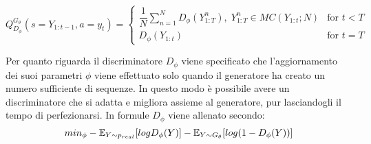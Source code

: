 $$
Q_{D_\phi}^{G_\theta}
( s = Y_{1:t-1} ,
a = y_t)
=
\left\{\begin{array}{lr}
    \dfrac{1}{N} \sum_{n=1}^N D_\phi (Y_{1:T}^n) ,\; Y_{1:T}^n \in MC(Y_{1:t};N)
      & \textrm{for } t < T \\

    D_\phi (Y_{1:t}) & \textrm{for } t = T

\end{array}\right.
$$

Per quanto riguarda il discriminatore $D_\phi$ viene specificato che l'aggiornamento dei suoi parametri $\phi$ viene effettuato solo quando il generatore ha creato un numero sufficiente di sequenze.
In questo modo è possibile avere un discriminatore che si adatta e migliora assieme al generatore, pur lasciandogli il tempo di perfezionarsi.
In formule $D_\phi$ viene allenato secondo:
$$
min_\phi
- \mathbb{E}_{Y \sim p_{real}} [ log D_\phi (Y) ]
- \mathbb{E}_{Y \sim G_\theta} [ log ( 1 - D_\phi(Y))]
$$


